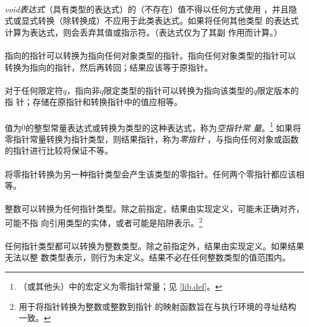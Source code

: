{

\paragraph{}
\textit{void表达式}（具有类型的表达式）的（不存在）值不得以任何方式使用
，并且隐式或显式转换（除转换成）不应用于此类表达式。如果将任何其他类型
的表达式计算为表达式，则会丢弃其值或指示符。（表达式仅为了其副
作用而计算。）

\paragraph{}
指向的指针可以转换为指向任何对象类型的指针。指向任何对象类型的指针可以
转换为指向的指针，然后再转回；结果应该等于原指针。

\paragraph{}
对于任何限定符$q$，指向非$q$限定类型的指针可以转换为指向该类型的$q$限定版本的指
针；存储在原指针和转换指针中的值应相等。

\paragraph{}
值为$0$的整型常量表达式或转换为类型的这种表达式，称为\textit{空指针常
量}。\footnote{（或其他头）中的宏定义为零指针常量；见
\ref{lib.def}。} 如果将零指针常量转换为指针类型，则结果指针，称为\textit{零指针}
，与指向任何对象或函数的指针进行比较将保证不等。

\paragraph{}
将零指针转换为另一种指针类型会产生该类型的零指针。任何两个零指针都应该相等。

\paragraph{}
整数可以转换为任何指针类型。除之前指定，结果由实现定义，可能未正确对齐，可能不指
向引用类型的实体，或者可能是陷阱表示。\footnote{用于将指针转换为整数或整数到指针
的映射函数旨在与执行环境的寻址结构一致。}

\paragraph{}
任何指针类型都可以转换为整数类型。除之前指定外，结果由实现定义。如果结果无法以整
数类型表示，则行为未定义。结果不必在任何整数类型的值范围内。

}
